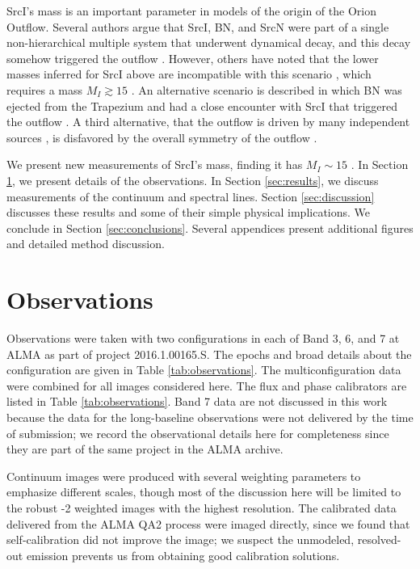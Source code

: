 \documentclass[twocolumn]{aastex62}
\newcommand{\sourcei}{SrcI\xspace}
\newcommand{\sourcen}{SrcN\xspace}
\newcommand{\sourcex}{SrcX\xspace}
\begin{document}
\sourcei's mass is an important parameter in models of the origin of the Orion
Outflow.  Several authors argue that \sourcei, BN, and \sourcen \citep[or,
alternatively, \sourcex;][]{Luhman2017a} were part of a single non-hierarchical
multiple system that underwent dynamical decay, and this decay somehow
triggered the outflow
\citep{Bally2005a,Rodriguez2005a,Goddi2011b,Moeckel2012b,Bally2011a,Bally2015a,Bally2017a,Rodriguez2017a}.
However, others have noted that the lower masses inferred for \sourcei above
are incompatible with this scenario
\citep{Chatterjee2012a,Plambeck2016a,Farias2017b}, which requires a mass $M_{I}
\gtrsim 15$ \msun.  An alternative scenario is described in which BN was
ejected from the Trapezium and had a close encounter with \sourcei that
triggered the outflow \citep{Tan2004a,Tan2008b,Chatterjee2012a}.  A third
alternative, that the outflow is driven by many independent sources
\citep{Beuther2008a}, is disfavored by the overall symmetry of the outflow
\citep{Bally2017a}.

We present new measurements of \sourcei's mass, finding it has $M_I \sim 15$ \msun.
In Section \ref{sec:observations}, we present details of the observations.
In Section \ref{sec:results}, we discuss measurements of the continuum
and spectral lines.  Section \ref{sec:discussion} discusses these results and
some of their simple physical implications.
We conclude in Section \ref{sec:conclusions}.
Several appendices present additional figures and detailed method discussion.


\section{Observations}
\label{sec:observations}

Observations were taken with two configurations in each of Band 3, 6, and 7 at
ALMA as part of project 2016.1.00165.S.  The epochs and broad details about the
configuration are given in Table \ref{tab:observations}.  The
multiconfiguration data were combined for all
images considered here.
The flux and phase calibrators are listed in Table \ref{tab:observations}.
Band 7 data are not discussed in this work because the data for
the long-baseline observations were not delivered by the time of submission; we
record the observational details here for completeness since they are part of
the same project in the ALMA archive.

Continuum images were produced with several weighting parameters to emphasize
different scales, though most of the discussion here will be limited to the
robust -2 weighted images with the highest resolution.  The calibrated data
delivered from the ALMA QA2 process were imaged directly, since we found
that self-calibration did not improve the image; we suspect the unmodeled, resolved-out
emission prevents us from obtaining good calibration solutions.
\end{document}
